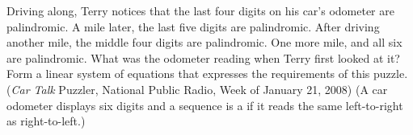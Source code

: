 Driving along, Terry notices that the last four digits on his car's odometer are palindromic. A mile later, the last five digits are palindromic. After driving another mile, the middle four digits are palindromic. One more mile, and all six are palindromic. What was the odometer reading when Terry first looked at it?  Form a linear system of equations that expresses the requirements of this puzzle.  ({\sl Car Talk} Puzzler,  National Public Radio, Week of January 21, 2008)  (A car odometer displays six digits and a sequence is a  if it reads the same left-to-right as right-to-left.)
